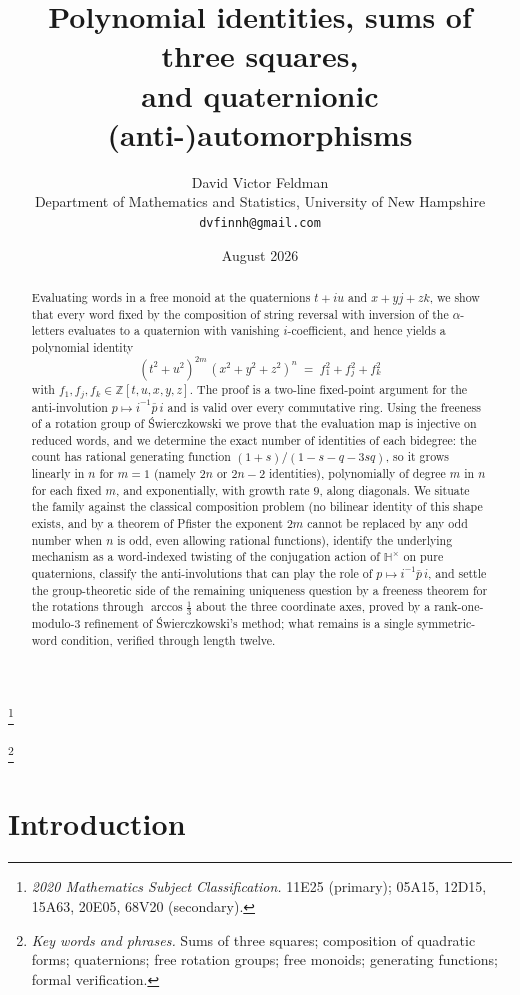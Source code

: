 \documentclass[11pt]{article}
\title{Polynomial identities, sums of three squares,\\ and quaternionic (anti-)automorphisms}
\author{David Victor Feldman\\ \small Department of Mathematics and Statistics, University of New Hampshire\\ \small \texttt{dvfinnh@gmail.com}}
\date{August 2026}
\theoremstyle{definition}
\theoremstyle{remark}
\newcommand{\HH}{\mathbb{H}}
\newcommand{\ZZ}{\mathbb{Z}}
\newcommand\blfootnote[1]{\begingroup\renewcommand\thefootnote{}\footnote{#1}\addtocounter{footnote}{-1}\endgroup}
\begin{document}
\maketitle
\blfootnote{\emph{2020 Mathematics Subject Classification.} 11E25 (primary); 05A15, 12D15, 15A63, 20E05, 68V20 (secondary).}
\blfootnote{\emph{Key words and phrases.} Sums of three squares; composition of quadratic forms; quaternions; free rotation groups; free monoids; generating functions; formal verification.}

\begin{abstract}
Evaluating words in a free monoid at the quaternions $t+iu$ and $x+yj+zk$, we show that every word fixed by the composition of string reversal with inversion of the $\alpha$-letters evaluates to a quaternion with vanishing $i$-coefficient, and hence yields a polynomial identity
\[
(t^2+u^2)^{2m}\,(x^2+y^2+z^2)^n \;=\; f_1^2+f_j^2+f_k^2
\]
with $f_1,f_j,f_k\in\ZZ[t,u,x,y,z]$. The proof is a two-line fixed-point argument for the anti-involution $p\mapsto i^{-1}\bar p\, i$ and is valid over every commutative ring. Using the freeness of a rotation group of Świerczkowski we prove that the evaluation map is injective on reduced words, and we determine the exact number of identities of each bidegree: the count has rational generating function $(1+s)/(1-s-q-3sq)$, so it grows linearly in $n$ for $m=1$ (namely $2n$ or $2n-2$ identities), polynomially of degree $m$ in $n$ for each fixed $m$, and exponentially, with growth rate $9$, along diagonals. We situate the family against the classical composition problem (no bilinear identity of this shape exists, and by a theorem of Pfister the exponent $2m$ cannot be replaced by any odd number when $n$ is odd, even allowing rational functions), identify the underlying mechanism as a word-indexed twisting of the conjugation action of $\HH^\times$ on pure quaternions, classify the anti-involutions that can play the role of $p\mapsto i^{-1}\bar p\,i$, and settle the group-theoretic side of the remaining uniqueness question by a freeness theorem for the rotations through $\arccos\frac13$ about the three coordinate axes, proved by a rank-one-modulo-$3$ refinement of Świerczkowski's method; what remains is a single symmetric-word condition, verified through length twelve.
\end{abstract}

\section{Introduction}\label{sec:intro}
\end{document}
